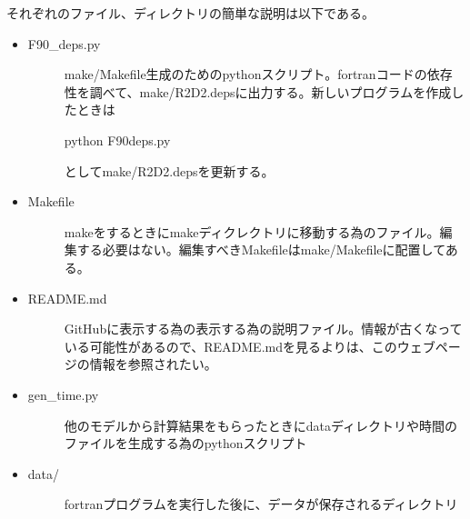 \documentclass[letterpaper,10pt,dvipdfmx,report]{sphinxmanual}
\begin{document}
それぞれのファイル、ディレクトリの簡単な説明は以下である。
\begin{itemize}
\item {} \begin{description}
\item[{F90\_deps.py}] \leavevmode
make/Makefile生成のためのpythonスクリプト。fortranコードの依存性を調べて、make/R2D2.depsに出力する。新しいプログラムを作成したときは

\begin{sphinxVerbatim}[commandchars=\\\{\}]
python F90\PYGZus{}deps.py
\end{sphinxVerbatim}

としてmake/R2D2.depsを更新する。

\end{description}

\item {} \begin{description}
\item[{Makefile}] \leavevmode
makeをするときにmakeディクレクトリに移動する為のファイル。編集する必要はない。編集すべきMakefileはmake/Makefileに配置してある。

\end{description}

\item {} \begin{description}
\item[{README.md}] \leavevmode
GitHubに表示する為の表示する為の説明ファイル。情報が古くなっている可能性があるので、README.mdを見るよりは、このウェブページの情報を参照されたい。

\end{description}

\item {} \begin{description}
\item[{gen\_time.py}] \leavevmode
他のモデルから計算結果をもらったときにdataディレクトリや時間のファイルを生成する為のpythonスクリプト

\end{description}

\item {} \begin{description}
\item[{data/}] \leavevmode
fortranプログラムを実行した後に、データが保存されるディレクトリ

\end{description}

\end{itemize}
\end{document}
